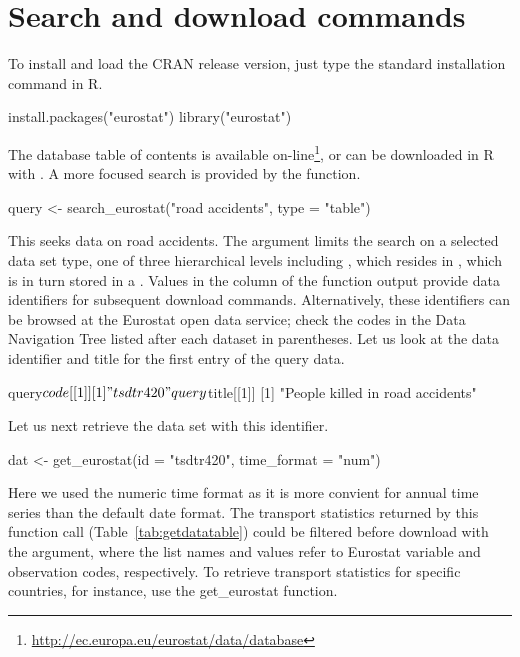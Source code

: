 \section{Search and download commands}

To install and load the CRAN release version, just type the standard installation command in R.

\begin{example}
  install.packages("eurostat")
  library("eurostat")
\end{example}


The database table of contents is available on-line\footnote{\url{http://ec.europa.eu/eurostat/data/database}}, or can be downloaded in R with . A more focused search is provided by the  function.

\begin{example}
  query <- search_eurostat("road accidents", type = "table")
\end{example}

This seeks data on road accidents. The  argument limits the search on a selected data set type, one of three hierarchical levels including , which resides in , which is in turn stored in a . Values in the  column of the  function output provide data identifiers for subsequent download commands. Alternatively, these identifiers can be browsed at the Eurostat open data service; check the codes in the Data Navigation Tree listed after each dataset in parentheses. Let us look at the data identifier and title for the first entry of the query data.

\begin{example}
  query$code[[1]]
  [1] "tsdtr420"

  query$title[[1]]
  [1] "People killed in road accidents"
\end{example}


Let us next retrieve the data set with this identifier.

\begin{example}
  dat <- get_eurostat(id = "tsdtr420", time_format = "num")
\end{example}

Here we used the numeric time format as it is more convient for annual
time series than the default date format. The transport statistics
returned by this function call (Table~\ref{tab:getdatatable}) could be
filtered before download with the  argument, where the
list names and values refer to Eurostat variable and observation
codes, respectively. To retrieve transport statistics for specific
countries, for instance, use the get\_eurostat function.

